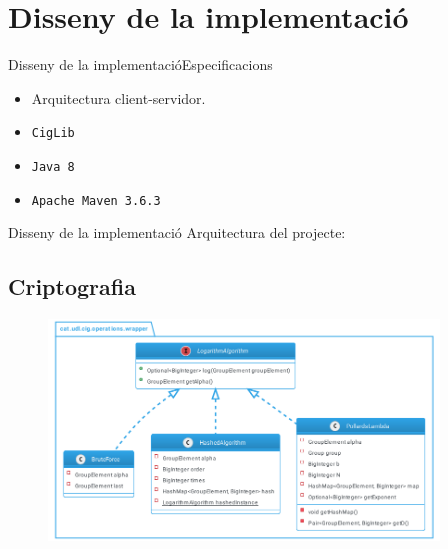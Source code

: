 \documentclass{beamer}
\begin{document}
\section{Disseny de la implementació}
\begin{frame}{Disseny de la implementació}{Especificacions}
	\begin{itemize}
		\item Arquitectura client-servidor.
		\item \texttt{CigLib}
		\item \texttt{Java 8}
		\item \texttt{Apache Maven 3.6.3}
	\end{itemize}
\end{frame}
\begin{frame}{Disseny de la implementació}
Arquitectura del projecte:
\end{frame}
\subsection{Criptografia}
\begin{frame}
	\begin{figure}
		\includegraphics[width=28em]{images/log}
	\end{figure}
\end{frame}
\end{document}
